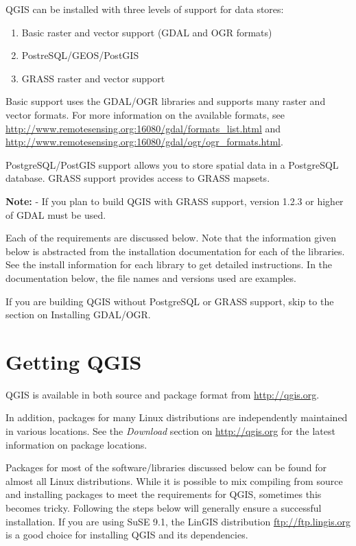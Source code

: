 QGIS can be installed with three levels of support for data stores:
\begin{enumerate}
\item Basic raster and vector support (GDAL and OGR formats)
\item PostreSQL/GEOS/PostGIS 
\item GRASS raster and vector support
\end{enumerate} 

Basic support uses the GDAL/OGR libraries and supports many raster and vector formats. For more information on the available formats, see \url{http://www.remotesensing.org:16080/gdal/formats\_list.html} and \url{http://www.remotesensing.org:16080/gdal/ogr/ogr\_formats.html}.

PostgreSQL/PostGIS support allows you to store spatial data in a PostgreSQL database. GRASS support provides access to GRASS mapsets. 

\textbf{Note:} - If you plan to build QGIS with GRASS support, version 1.2.3 or higher of GDAL must be used. 
  
Each of the requirements are discussed below. Note that the information given below is abstracted from the installation documentation for each of the libraries. See the install information for each library to get detailed instructions. In the documentation below, the file names and versions used are examples.


If you are building QGIS without PostgreSQL or GRASS support, skip to the section on Installing GDAL/OGR. 
\section{Getting QGIS}
QGIS is available in both source and package format from \url{http://qgis.org}. 

In addition, packages for many Linux distributions are independently maintained in various locations. See 
the \textit{Download} section on \url{http://qgis.org} for the latest information on package locations.

Packages for most of the software/libraries discussed below can be found for almost all Linux distributions. While it is possible to mix compiling from source and installing packages to meet the requirements for QGIS, sometimes this becomes tricky. Following the steps below will generally ensure a successful installation. If you are using SuSE 9.1, the LinGIS distribution \url{ftp://ftp.lingis.org} is a good choice for installing QGIS and its dependencies.


